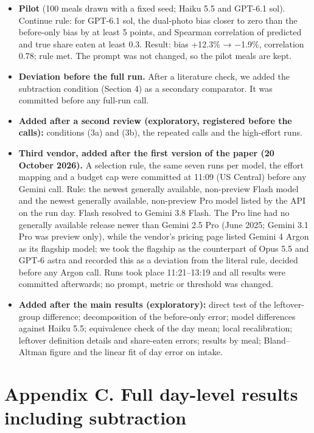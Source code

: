 \documentclass[
  11pt,
  letterpaper]{article}
\providecommand{\tightlist}{%
  \setlength{\itemsep}{0pt}\setlength{\parskip}{0pt}}
\begin{document}
\begin{itemize}
\tightlist
\item
  \textbf{Pilot} (100 meals drawn with a fixed seed; Haiku 5.5 and GPT-6.1 sol). Continue rule: for GPT-6.1
  sol, the dual-photo bias closer to zero than the before-only bias by at least 5 points, and Spearman
  correlation of predicted and true share eaten at least 0.3. Result: bias +12.3\% → −1.9\%, correlation 0.78;
  rule met. The prompt was not changed, so the pilot meals are kept.
\item
  \textbf{Deviation before the full run.} After a literature check, we added the subtraction condition
  (Section 4) as a secondary comparator. It was committed before any full-run call.
\item
  \textbf{Added after a second review (exploratory, registered before the calls):} conditions (3a) and (3b),
  the repeated calls and the high-effort runs.
\item
  \textbf{Third vendor, added after the first version of the paper (20 October 2026).} A selection rule, the
  same seven runs per model, the effort mapping and a budget cap were committed at 11:09 (US Central) before
  any Gemini call. Rule: the newest generally available, non-preview Flash model and the newest generally
  available, non-preview Pro model listed by the API on the run day. Flash resolved to Gemini 3.8 Flash. The
  Pro line had no generally available release newer than Gemini 2.5 Pro (June 2025; Gemini 3.1 Pro was preview
  only), while the vendor's pricing page listed Gemini 4 Argon as its flagship model; we took the flagship as
  the counterpart of Opus 5.5 and GPT-6 astra and recorded this as a deviation from the literal rule, decided
  before any Argon call. Runs took place 11:21--13:19 and all results were committed afterwards; no prompt,
  metric or threshold was changed.
\item
  \textbf{Added after the main results (exploratory):} direct test of the leftover-group difference;
  decomposition of the before-only error; model differences against Haiku 5.5; equivalence check of the day
  mean; local recalibration; leftover definition details and share-eaten errors; results by meal;
  Bland--Altman figure and the linear fit of day error on intake.
\end{itemize}

\section*{Appendix C. Full day-level results including
subtraction}\label{appendix-c.-full-day-level-results-including-subtraction}
\end{document}
